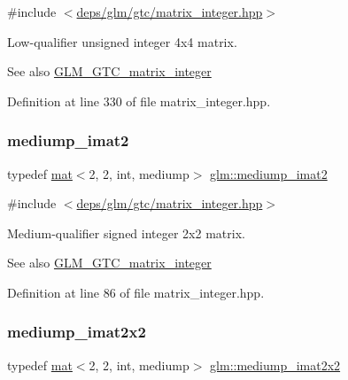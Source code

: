 {\ttfamily \#include $<$\hyperlink{matrix__integer_8hpp}{deps/glm/gtc/matrix\+\_\+integer.\+hpp}$>$}

Low-\/qualifier unsigned integer 4x4 matrix. \begin{DoxySeeAlso}{See also}
\hyperlink{group__gtc__matrix__integer}{G\+L\+M\+\_\+\+G\+T\+C\+\_\+matrix\+\_\+integer} 
\end{DoxySeeAlso}


Definition at line 330 of file matrix\+\_\+integer.\+hpp.

\mbox{\label{group__gtc__matrix__integer_ga74e065ab9524e6b7bd5a84cffb758e71}} 
\subsubsection{\texorpdfstring{mediump\+\_\+imat2}{mediump\_imat2}}
{\footnotesize\ttfamily typedef \hyperlink{structglm_1_1mat}{mat}$<$2, 2, int, mediump$>$ \hyperlink{group__gtc__matrix__integer_ga74e065ab9524e6b7bd5a84cffb758e71}{glm\+::mediump\+\_\+imat2}}



{\ttfamily \#include $<$\hyperlink{matrix__integer_8hpp}{deps/glm/gtc/matrix\+\_\+integer.\+hpp}$>$}

Medium-\/qualifier signed integer 2x2 matrix. \begin{DoxySeeAlso}{See also}
\hyperlink{group__gtc__matrix__integer}{G\+L\+M\+\_\+\+G\+T\+C\+\_\+matrix\+\_\+integer} 
\end{DoxySeeAlso}


Definition at line 86 of file matrix\+\_\+integer.\+hpp.

\mbox{\label{group__gtc__matrix__integer_gafe326375aa42c0abbe571d376f4cbd95}} 
\subsubsection{\texorpdfstring{mediump\+\_\+imat2x2}{mediump\_imat2x2}}
{\footnotesize\ttfamily typedef \hyperlink{structglm_1_1mat}{mat}$<$2, 2, int, mediump$>$ \hyperlink{group__gtc__matrix__integer_gafe326375aa42c0abbe571d376f4cbd95}{glm\+::mediump\+\_\+imat2x2}}




